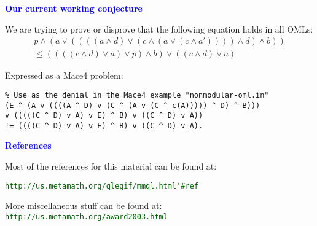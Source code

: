 \documentclass{slides}
\begin{document}
\begin{slide}

\begin{center}
\textcolor{blue}{\textbf{Our current working conjecture}}
\end{center}


We are trying to prove or disprove that the following equation holds
in all OMLs:
\begin{eqnarray}
p\wedge (a\vee ((((a\wedge d)\vee (c\wedge (a\vee (c\wedge a'))))\wedge d)\wedge b))\nonumber\\
\le ((((c\wedge d)\vee a)\vee p)\wedge b)\vee ((c\wedge d)\vee a)
\end{eqnarray}


Expressed as a Mace4 problem:
\begin{verbatim}
% Use as the denial in the Mace4 example "nonmodular-oml.in"
(E ^ (A v ((((A ^ D) v (C ^ (A v (C ^ c(A))))) ^ D) ^ B)))
v (((((C ^ D) v A) v E) ^ B) v ((C ^ D) v A))
!= ((((C ^ D) v A) v E) ^ B) v ((C ^ D) v A).
\end{verbatim}

\end{slide}


\begin{slide}

\begin{center}
\textcolor{blue}{\textbf{References}}

Most of the references for this material can be found at:

\textcolor{darkgreen}{
\texttt{http://us.metamath.org/qlegif/mmql.html{\char`\#}ref}}

\vspace{3ex}

More miscellaneous stuff can be found at:\\
\textcolor{darkgreen}{
\texttt{http://us.metamath.org/award2003.html}}

\end{center}
\end{slide}
\end{document}
